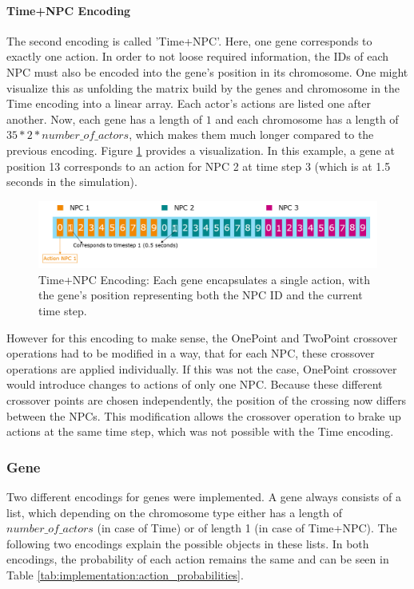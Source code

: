 \paragraph{Time+NPC Encoding}
The second encoding is called 'Time+NPC'. Here, one gene corresponds to exactly one action. In order to not loose required information, the IDs of each NPC must also be encoded into the gene's position in its chromosome. One might visualize this as unfolding the matrix build by the genes and chromosome in the Time encoding into a linear array. Each actor's actions are listed one after another. Now, each gene has a length of $1$ and each chromosome has a length of $35 * 2 * number\_of\_actors$, which makes them much longer compared to the previous encoding. Figure \ref{fig:implementation:encoding_chromosome_time_npc} provides a visualization. In this example, a gene at position 13 corresponds to an action for NPC 2 at time step 3 (which is at 1.5 seconds in the simulation).

\begin{figure}[ht] 
	\includegraphics[width=1\linewidth]{figures/time_npc_encoding}
	\caption{Time+NPC Encoding: Each gene encapsulates a single action, with the gene's position representing both the NPC ID and the current time step.}
	\label{fig:implementation:encoding_chromosome_time_npc}
\end{figure}

However for this encoding to make sense, the OnePoint and TwoPoint crossover operations had to be modified in a way, that for each NPC, these crossover operations are applied individually. If this was not the case, OnePoint crossover would introduce changes to actions of only one NPC. Because these different crossover points are chosen independently, the position of the crossing now differs between the NPCs. This modification allows the crossover operation to brake up actions at the same time step, which was not possible with the Time encoding.

\subsubsection{Gene}
Two different encodings for genes were implemented. A gene always consists of a list, which depending on the chromosome type either has a length of $number\_of\_actors$ (in case of Time) or of length 1 (in case of Time+NPC). The following two encodings explain the possible objects in these lists. In both encodings, the probability of each action remains the same and can be seen in Table \ref{tab:implementation:action_probabilities}.

